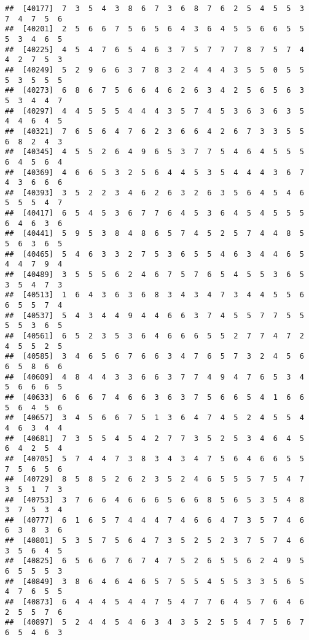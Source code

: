 \documentclass[
]{book}
\begin{document}
\begin{verbatim}
##  [40177]  7  3  5  4  3  8  6  7  3  6  8  7  6  2  5  4  5  5  3  7  4  7  5  6
##  [40201]  2  5  6  6  7  5  6  5  6  4  3  6  4  5  5  6  6  5  5  5  3  4  6  5
##  [40225]  4  5  4  7  6  5  4  6  3  7  5  7  7  7  8  7  5  7  4  4  2  7  5  3
##  [40249]  5  2  9  6  6  3  7  8  3  2  4  4  4  3  5  5  0  5  5  5  3  5  5  5
##  [40273]  6  8  6  7  5  6  6  4  6  2  6  3  4  2  5  6  5  6  3  5  3  4  4  7
##  [40297]  4  4  5  5  5  4  4  4  3  5  7  4  5  3  6  3  6  3  5  4  4  6  4  5
##  [40321]  7  6  5  6  4  7  6  2  3  6  6  4  2  6  7  3  3  5  5  6  8  2  4  3
##  [40345]  4  5  5  2  6  4  9  6  5  3  7  7  5  4  6  4  5  5  5  6  4  5  6  4
##  [40369]  4  6  6  5  3  2  5  6  4  4  5  3  5  4  4  4  3  6  7  4  3  6  6  6
##  [40393]  3  5  2  2  3  4  6  2  6  3  2  6  3  5  6  4  5  4  6  5  5  5  4  7
##  [40417]  6  5  4  5  3  6  7  7  6  4  5  3  6  4  5  4  5  5  5  6  4  6  3  6
##  [40441]  5  9  5  3  8  4  8  6  5  7  4  5  2  5  7  4  4  8  5  5  6  3  6  5
##  [40465]  5  4  6  3  3  2  7  5  3  6  5  5  4  6  3  4  4  6  5  4  4  7  9  4
##  [40489]  3  5  5  5  6  2  4  6  7  5  7  6  5  4  5  5  3  6  5  3  5  4  7  3
##  [40513]  1  6  4  3  6  3  6  8  3  4  3  4  7  3  4  4  5  5  6  6  5  5  7  4
##  [40537]  5  4  3  4  4  9  4  4  6  6  3  7  4  5  5  7  7  5  5  5  5  3  6  5
##  [40561]  6  5  2  3  5  3  6  4  6  6  6  5  5  2  7  7  4  7  2  4  5  5  2  5
##  [40585]  3  4  6  5  6  7  6  6  3  4  7  6  5  7  3  2  4  5  6  6  5  8  6  6
##  [40609]  4  8  4  4  3  3  6  6  3  7  7  4  9  4  7  6  5  3  4  5  6  6  6  5
##  [40633]  6  6  6  7  4  6  6  3  6  3  7  5  6  6  5  4  1  6  6  5  6  4  5  6
##  [40657]  3  4  5  6  6  7  5  1  3  6  4  7  4  5  2  4  5  5  4  4  6  3  4  4
##  [40681]  7  3  5  5  4  5  4  2  7  7  3  5  2  5  3  4  6  4  5  6  4  2  5  4
##  [40705]  5  7  4  4  7  3  8  3  4  3  4  7  5  6  4  6  6  5  5  7  5  6  5  6
##  [40729]  8  5  8  5  2  6  2  3  5  2  4  6  5  5  5  7  5  4  7  3  5  1  7  3
##  [40753]  3  7  6  6  4  6  6  6  5  6  6  8  5  6  5  3  5  4  8  3  7  5  3  4
##  [40777]  6  1  6  5  7  4  4  4  7  4  6  6  4  7  3  5  7  4  6  6  3  8  3  6
##  [40801]  5  3  5  7  5  6  4  7  3  5  2  5  2  3  7  5  7  4  6  3  5  6  4  5
##  [40825]  6  5  6  6  7  6  7  4  7  5  2  6  5  5  6  2  4  9  5  6  5  5  5  3
##  [40849]  3  8  6  4  6  4  6  5  7  5  5  4  5  5  3  3  5  6  5  4  7  6  5  5
##  [40873]  6  4  4  4  5  4  4  7  5  4  7  7  6  4  5  7  6  4  6  2  5  5  7  6
##  [40897]  5  2  4  4  5  4  6  3  4  3  5  2  5  5  4  7  5  6  7  6  5  4  6  3

\end{verbatim}
\end{document}
